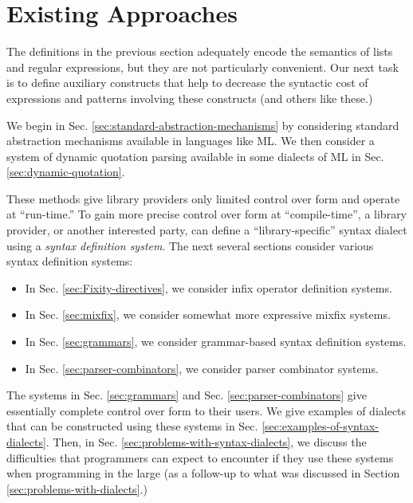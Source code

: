 \section{Existing Approaches}\label{sec:existing-approaches}
The definitions in the previous section adequately encode the semantics of lists and regular expressions, but they are not particularly convenient. Our next task  is to define auxiliary constructs that help to decrease the syntactic cost of expressions and patterns involving these constructs (and others like these.) 


We begin in Sec. \ref{sec:standard-abstraction-mechanisms} by considering standard abstraction mechanisms available in languages like ML. We then consider a system of dynamic quotation parsing available in some dialects of ML in Sec. \ref{sec:dynamic-quotation}. 

These methods give library providers only limited control over form and operate at ``run-time.'' To gain more precise control over form at ``compile-time'', a library provider, or another interested party, can define a ``library-specific'' syntax dialect using a \emph{syntax definition system}. The next several sections consider various syntax definition systems:
\begin{itemize}
\item In Sec. \ref{sec:Fixity-directives}, we consider infix operator definition systems.
\item In Sec. \ref{sec:mixfix}, we consider somewhat more expressive mixfix systems.
\item In Sec. \ref{sec:grammars}, we consider grammar-based syntax definition systems.
\item In Sec. \ref{sec:parser-combinators}, we consider parser combinator systems.
\end{itemize}
The systems in Sec. \ref{sec:grammars} and Sec. \ref{sec:parser-combinators} give essentially complete control over form to their users. We give examples of dialects that can be constructed using these systems in Sec. \ref{sec:examples-of-syntax-dialects}. Then, in Sec. \ref{sec:problems-with-syntax-dialects}, we discuss the difficulties that programmers can expect to encounter if they  use these systems when programming in the large (as a follow-up to what was discussed in Section \ref{sec:problems-with-dialects}.)

